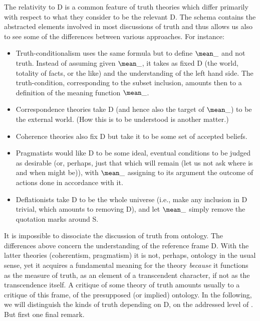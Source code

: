 The relativity to D is a common feature of truth theories which differ primarily
with respect to what they consider to be the relevant D.
The schema  contains the abstracted elements involved in most discussions
 of truth and thus allows us also to see some of the differences
between various approaches. For instance:

\begin{itemize}
\item
Truth-conditionalism uses the same formula but to define $\mean\_$ and not
truth. Instead of assuming given $\mean\_$, it takes as fixed D (the world,
totality of facts, or the like) and the understanding of the left hand side. The
truth-condition, corresponding to the subset inclusion, amounts then to a
definition of the meaning function $\mean\_$.  
\item  
Correspondence theories take D (and hence also the target of
$\mean\_$) to be the external world. (How this is to be understood is another
matter.) 
\item  
Coherence theories also fix D but take it to be some set of accepted beliefs.
\item  
Pragmatists would like D to be some ideal, eventual conditions to be judged as
desirable (or, perhaps, just that which will remain 
(let us not ask where  is and when  might be)), with
$\mean\_$ assigning to its argument the outcome of actions done in accordance
with it. 
\item  
Deflationists take D to be the whole universe (i.e., make any inclusion in D
trivial, which amounts to removing D), and let $\mean\_$ simply remove the
quotation marks around S.
\end{itemize}
It is impossible to dissociate the discussion of truth from ontology.  The
differences above concern the understanding of the reference frame D. With the
latter theories (coherentism, pragmatism) it is not, perhaps, ontology in the
usual sense, yet it acquires a fundamental meaning for the theory {\em because}
it functions as the measure of truth, as an element of a transcendent character,
if not as the transcendence itself.  A critique of some theory of truth amounts
usually to a critique of this frame, of the presupposed (or implied)
ontology. In the following, we will distinguish the kinds of truth
depending on D, on the addressed level of . But first one final remark.

